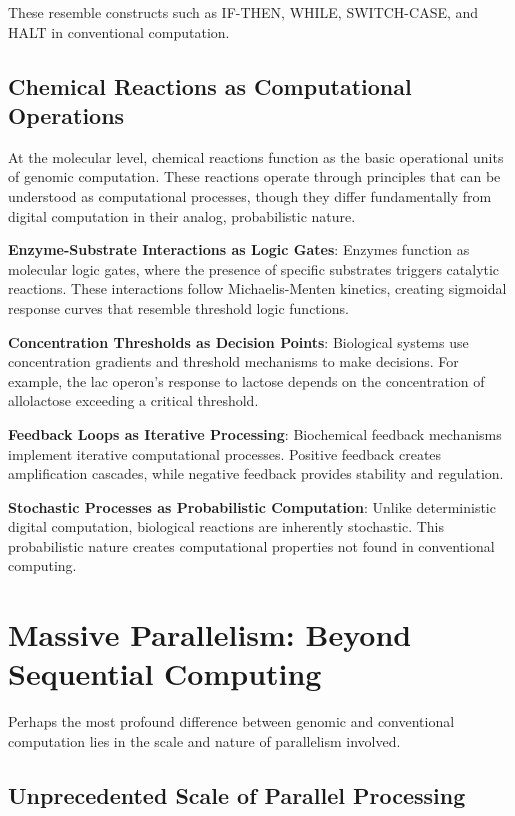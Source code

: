\documentclass[11pt]{article}
\begin{document}
These resemble constructs such as IF-THEN, WHILE, SWITCH-CASE, and HALT in conventional computation.

\subsection{Chemical Reactions as Computational Operations}

At the molecular level, chemical reactions function as the basic operational units of genomic computation. These reactions operate through principles that can be understood as computational processes, though they differ fundamentally from digital computation in their analog, probabilistic nature.

\textbf{Enzyme-Substrate Interactions as Logic Gates}: Enzymes function as molecular logic gates, where the presence of specific substrates triggers catalytic reactions. These interactions follow Michaelis-Menten kinetics, creating sigmoidal response curves that resemble threshold logic functions.

\textbf{Concentration Thresholds as Decision Points}: Biological systems use concentration gradients and threshold mechanisms to make decisions. For example, the lac operon's response to lactose depends on the concentration of allolactose exceeding a critical threshold.

\textbf{Feedback Loops as Iterative Processing}: Biochemical feedback mechanisms implement iterative computational processes. Positive feedback creates amplification cascades, while negative feedback provides stability and regulation.

\textbf{Stochastic Processes as Probabilistic Computation}: Unlike deterministic digital computation, biological reactions are inherently stochastic. This probabilistic nature creates computational properties not found in conventional computing.

\section{Massive Parallelism: Beyond Sequential Computing}

Perhaps the most profound difference between genomic and conventional computation lies in the scale and nature of parallelism involved.

\subsection{Unprecedented Scale of Parallel Processing}
\end{document}
